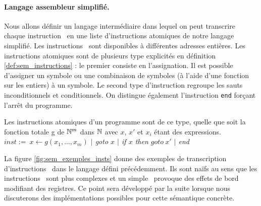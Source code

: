 
\paragraph{Langage assembleur simplifié.} Nous allons définir un langage intermédiaire dans lequel on peut transcrire chaque instruction \xq\ en une liste d'instructions atomiques de notre langage simplifié.
Les instructions \xq\ sont disponibles à différentes adresses entières. 
Les instructions atomiques sont de plusieurs type explicités en définition \ref{def:sem_instructions} : le premier consiste en l'assignation.
Il est possible d'assigner un symbole ou une combinaison de symboles (à l'aide d'une fonction sur les entiers) à un symbole. 
Le second type d'instruction regroupe les sauts inconditionnels et conditionnels.
On distingue également l'instruction \texttt{end} forçant l'arrêt du programme.

\begin{defi}
Les instructions atomiques d'un programme sont de ce type, quelle que soit la fonction totale g de $\mathbb N^m$ dans $\mathbb N$ avec $x$, $x'$ et $x_i$ étant des expressions.\\
$inst:=\ $\emph{$x\leftarrow g(x_1, ..., x_m)$ $|$ goto $x$ $|$ if $x$ then $goto\ x'$ $|$ end}
\label{def:sem_instructions}
\end{defi}


La figure \ref{fig:sem_exemples_insts} donne des exemples de transcription d'instructions \xq\ dans le langage défini précédemment. 
Ils sont naïfs au sens que les instructions \xq\ sont plus complexes et un simple \sub\ provoque des effets de bord modifiant des registres. Ce point sera développé par la suite lorsque nous discuterons des implémentations possibles pour cette sémantique concrète.
\\

